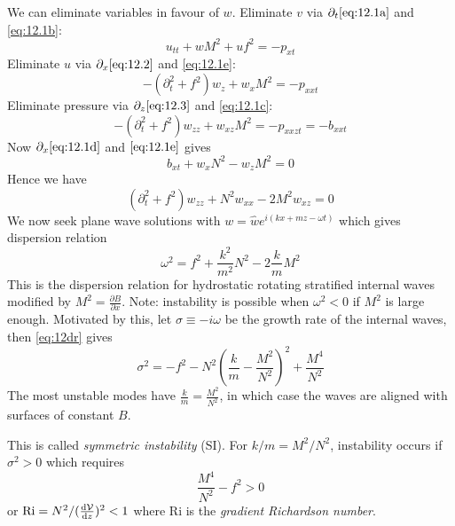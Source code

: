 \documentclass{jknotes}
\begin{document}
We can eliminate variables in favour of $w$. Eliminate $v$ via
$\partial_t \eqref{eq:12.1a}$ and \eqref{eq:12.1b}:
\begin{equation}
	u_{tt} + wM^2 + uf^2 = -p_{xt} \label{eq:12.2}
\end{equation}
Eliminate $u$ via $\partial_x \eqref{eq:12.2}$ and \eqref{eq:12.1e}:
\begin{equation}
	-(\partial_t^2 + f^2)w_z + w_x M^2 = -p_{xxt} \label{eq:12.3}
\end{equation}
Eliminate pressure via $\partial_z \eqref{eq:12.3}$ and \eqref{eq:12.1c}:
\begin{equation}
	-(\partial_t^2 + f^2) w_{zz} + w_{xz} M^2 = -p_{xxzt} = -b_{xxt}
\end{equation}
Now $\partial_x \eqref{eq:12.1d}$ and $\eqref{eq:12.1e}$ gives
\begin{equation}
	b_{xt} + w_x N^2 - w_z M^2 = 0
\end{equation}
Hence we have
\begin{equation}
	(\partial_t^2 + f^2) w_{zz} + N^2 w_{xx} - 2M^2 w_{xz} = 0
\end{equation}
We now seek plane wave solutions with $w = \hat{w} e^{i(kx + mz - \omega t)}$
which gives dispersion relation
\begin{equation}
	\omega^2 = f^2 + \frac{k^2}{m^2} N^2 - 2\frac{k}{m} M^2 \label{eq:12dr}
\end{equation}
This is the dispersion relation for hydrostatic rotating stratified internal
waves modified by $M^2 = \frac{\partial B}{\partial x}$. Note: instability is
possible when $\omega^2 < 0$ if $M^2$ is large enough. Motivated by this, let
$\sigma \equiv -i\omega$ be the growth rate of the internal waves, then
\eqref{eq:12dr} gives
\begin{equation}
	\sigma^2 = -f^2 - N^2 \left( \frac{k}{m}-\frac{M^2}{N^2}\right)^2 +
	\frac{M^4}{N^2}
\end{equation}
The most unstable modes have $\frac{k}{m} = \frac{M^2}{N^2}$, in which case
the waves are aligned with surfaces of constant $B$.
\begin{center}
\end{center}

This is called \emph{symmetric instability} (SI). For $k/m = M^2/N^2$,
instability occurs if $\sigma^2 > 0$ which requires
\begin{equation}
	\frac{M^4}{N^2} - f^2 > 0
\end{equation}
or $\text{Ri} = N^2/(\frac{\diffd \mathcal{V}}{\diffd z})^2 < 1$ where
$\text{Ri}$ is the \emph{gradient Richardson number}.
\end{document}
